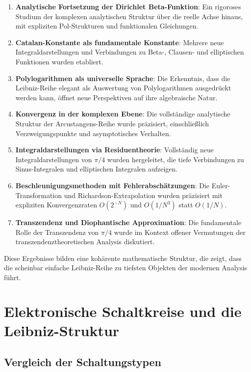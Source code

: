 \documentclass[a4paper,12pt,twoside]{report}
\theoremstyle{definition}
\begin{document}
\begin{enumerate}
	\item \textbf{Analytische Fortsetzung der Dirichlet Beta-Funktion}: Ein rigoroses Studium der komplexen analytischen Struktur über die reelle Achse hinaus, mit expliziten Pol-Strukturen und funktionalen Gleichungen.
	
	\item \textbf{Catalan-Konstante als fundamentale Konstante}: Mehrere neue Integraldarstellungen und Verbindungen zu Beta-, Clausen- und elliptischen Funktionen wurden etabliert.
	
	\item \textbf{Polylogarithmen als universelle Sprache}: Die Erkenntnis, dass die Leibniz-Reihe elegant als Auswertung von Polylogarithmen ausgedrückt werden kann, öffnet neue Perspektiven auf ihre algebraische Natur.
	
	\item \textbf{Konvergenz in der komplexen Ebene}: Die vollständige analytische Struktur der Arcustangens-Reihe wurde präzisiert, einschließlich Verzweigungspunkte und asymptotisches Verhalten.
	
	\item \textbf{Integraldarstellungen via Residuentheorie}: Vollständig neue Integraldarstellungen von $\pi/4$ wurden hergeleitet, die tiefe Verbindungen zu Sinus-Integralen und elliptischen Integralen aufzeigen.
	
	\item \textbf{Beschleunigungsmethoden mit Fehlerabschätzungen}: Die Euler-Transformation und Richardson-Extrapolation wurden präzisiert mit expliziten Konvergenzraten $O(2^{-N})$ und $O(1/N^3)$ statt $O(1/N)$.
	
	\item \textbf{Transzendenz und Diophantische Approximation}: Die fundamentale Rolle der Transzendenz von $\pi/4$ wurde im Kontext offener Vermutungen der transzendenztheoretischen Analysis diskutiert.
\end{enumerate}

Diese Ergebnisse bilden eine kohärente mathematische Struktur, die zeigt, dass die scheinbar einfache Leibniz-Reihe zu tiefsten Objekten der modernen Analysis führt.

\section{Elektronische Schaltkreise und die Leibniz-Struktur}

\subsection{Vergleich der Schaltungstypen}
\end{document}
